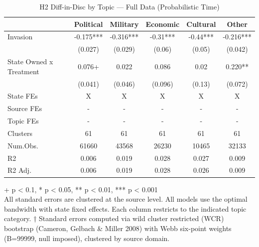 \begin{table}[t]
\caption{\label{tab:table-s05}H2 Diff-in-Disc by Topic — Full Data (Probabilistic Time)}
\fontsize{12.0pt}{14.0pt}\selectfont
\begin{tabular*}{\linewidth}{@{\extracolsep{\fill}}lccccc}
\toprule
  & Political & Military & Economic & Cultural & Other \\ 
\midrule\addlinespace[2.5pt]
Invasion & -0.175*** & -0.316*** & -0.31*** & -0.44*** & -0.216*** \\ 
 & (0.027) & (0.029) & (0.06) & (0.05) & (0.042) \\ 
State Owned x Treatment & 0.076+ & 0.022 & 0.086 & 0.02 & 0.220** \\ 
{} & {(0.041)} & {(0.046)} & {(0.096)} & {(0.13)} & {(0.072)} \\ 
State FEs & X & X & X & X & X \\ 
Source FEs & - & - & - & - & - \\ 
Topic FEs & - & - & - & - & - \\ 
Clusters & 61 & 61 & 61 & 61 & 61 \\ 
Num.Obs. & 61660 & 43568 & 26230 & 10465 & 32133 \\ 
R2 & 0.006 & 0.019 & 0.028 & 0.027 & 0.009 \\ 
R2 Adj. & 0.006 & 0.019 & 0.028 & 0.026 & 0.009 \\ 
\bottomrule
\end{tabular*}
\begin{minipage}{\linewidth}
\vspace{.05em}
+ p < 0.1, * p < 0.05, ** p < 0.01, *** p < 0.001\\
All standard errors are clustered at the source level. All models use the
optimal bandwidth with state fixed effects. Each column restricts to the
indicated topic category. † Standard errors computed via wild cluster restricted
(WCR) bootstrap (Cameron, Gelbach \& Miller 2008) with Webb six-point weights
(B=99999, null imposed), clustered by source domain.\\
\end{minipage}
\end{table}


